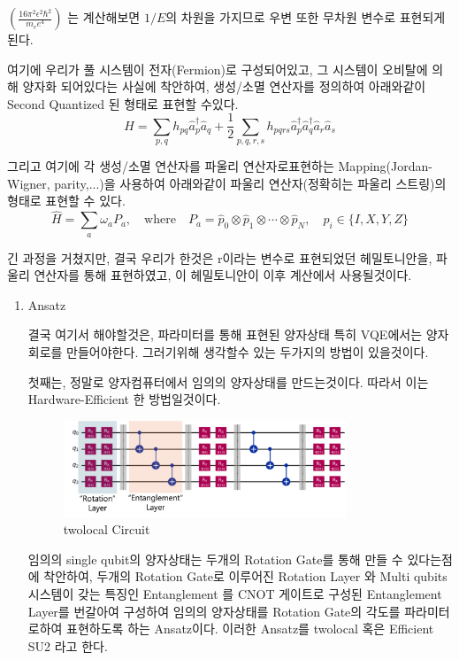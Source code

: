 \documentclass[11pt]{article}
\begin{document}
\begin{enumerate}[label=3)]
\begin{enumerate}[label=\(\mathrm{i}\))]
\(\left(\frac{16\pi^2\epsilon^2\hbar^2}{m_ee^4}\right)\) 는 계산해보면 \(1/E\)의 차원을 가지므로 우변 또한 무차원 변수로 표현되게 된다. 

여기에 우리가 풀 시스템이 전자(Fermion)로 구성되어있고, 그 시스템이 오비탈에 의해 양자화 되어있다는 사실에 착안하여, 생성/소멸 연산자를 정의하여 아래와같이 Second Quantized 된 형태로 표현할 수있다. 
\[
\hat{H} = \sum_{p,q} h_{pq} \hat{a}_p^\dagger \hat{a}_q
+ \frac{1}{2} \sum_{p,q,r,s} h_{pqrs} \hat{a}_p^\dagger \hat{a}_q^\dagger \hat{a}_r \hat{a}_s
\]

그리고 여기에 각 생성/소멸 연산자를 파울리 연산자로표현하는 Mapping(Jordan-Wigner, parity,...)을 사용하여 아래와같이 파울리 연산자(정확히는 파울리 스트링)의 형태로 표현할 수 있다. 
\[
\hat{H} = \sum_{a} \omega_a P_a, \quad \text{where} \quad
P_a = \hat{p}_0 \otimes \hat{p}_1 \otimes \cdots \otimes \hat{p}_N, \quad
\hat{p}_i \in \{I, X, Y, Z\}
\]

긴 과정을 거쳤지만, 결국 우리가 한것은 r이라는 변수로 표현되었던 헤밀토니안을, 파울리 연산자를 통해 표현하였고, 이 헤밀토니안이 이후 계산에서 사용될것이다. 

\end{enumerate}

\begin{enumerate}[label=\(\mathrm{ii}\))]
\item {Ansatz}


결국 여기서 해야할것은, 파라미터를 통해 표현된 양자상태 특히 VQE에서는 양자회로를 만들어야한다. 
그러기위해 생각할수 있는 두가지의 방법이 있을것이다. 

첫째는, 정말로 양자컴퓨터에서 임의의 양자상태를 만드는것이다. 따라서 이는 Hardware-Efficient 한 방법일것이다. 

\begin{figure}[H]
  \centering
  \includegraphics[width=0.8\textwidth]{fig/twolocal.png}
  \caption{twolocal Circuit}
  \label{fig:example3}
\end{figure}

임의의 single qubit의 양자상태는 두개의 Rotation Gate를 통해 만들 수 있다는점에 착안하여, 
두개의 Rotation Gate로 이루어진 Rotation Layer 와 Multi qubits 시스템이 갖는 특징인 Entanglement 를 CNOT 게이트로 구성된 Entanglement Layer를 번갈아여 구성하여
임의의 양자상태를 Rotation Gate의 각도를 파라미터로하여 표현하도록 하는 Ansatz이다. 이러한 Ansatz를 twolocal 혹은 Efficient SU2 라고 한다. 


\end{enumerate}
\end{enumerate}
\end{document}
